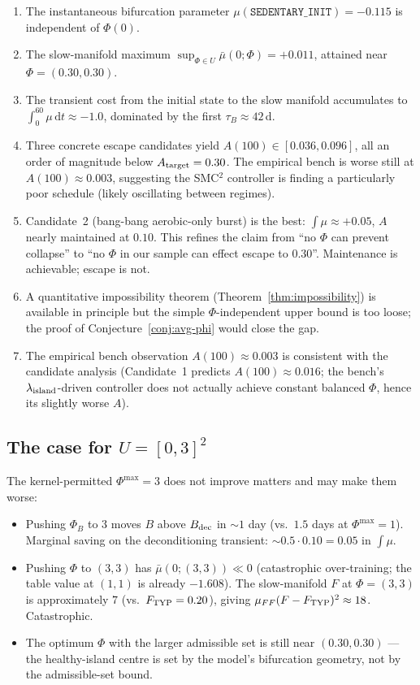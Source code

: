 \documentclass[11pt,a4paper]{article}
\theoremstyle{definition}
\newcommand{\dd}{\,\mathrm{d}}
\begin{document}
\begin{enumerate}
  \item The instantaneous bifurcation parameter $\mu(\texttt{SEDENTARY\_INIT}) = -0.115$ is independent of $\Phi(0)$.
  \item The slow-manifold maximum $\sup_{\Phi \in U} \bar\mu(0; \Phi) = +0.011$, attained near $\Phi = (0.30, 0.30)$.
  \item The transient cost from the initial state to the slow manifold accumulates to $\int_0^{60} \mu \dd t \approx -1.0$, dominated by the first $\tau_B \approx 42$\,d.
  \item Three concrete escape candidates yield $A(100) \in [0.036, 0.096]$, all an order of magnitude below $A_{\rm target} = 0.30$. The empirical bench is worse still at $A(100) \approx 0.003$, suggesting the SMC$^2$ controller is finding a particularly poor schedule (likely oscillating between regimes).
  \item Candidate~2 (bang-bang aerobic-only burst) is the best: $\int \mu \approx +0.05$, $A$ nearly maintained at $0.10$. This refines the claim from ``no $\Phi$ can prevent collapse'' to ``no $\Phi$ in our sample can effect escape to $0.30$''. Maintenance is achievable; escape is not.
  \item A quantitative impossibility theorem (Theorem~\ref{thm:impossibility}) is available in principle but the simple $\Phi$-independent upper bound is too loose; the proof of Conjecture~\ref{conj:avg-phi} would close the gap.
  \item The empirical bench observation $A(100) \approx 0.003$ is consistent with the candidate analysis (Candidate~1 predicts $A(100) \approx 0.016$; the bench's $\lambda_{\rm island}$-driven controller does not actually achieve constant balanced $\Phi$, hence its slightly worse $A$).
\end{enumerate}

\subsection{The case for $U = [0,3]^2$}

The kernel-permitted $\Phi^{\max} = 3$ does not improve matters and may make them worse:

\begin{itemize}
  \item Pushing $\Phi_B$ to $3$ moves $B$ above $B_{\rm dec}$ in $\sim 1$ day (vs.\ $1.5$ days at $\Phi^{\max} = 1$). Marginal saving on the deconditioning transient: $\sim 0.5 \cdot 0.10 = 0.05$ in $\int \mu$.
  \item Pushing $\Phi$ to $(3, 3)$ has $\bar\mu(0; (3,3)) \ll 0$ (catastrophic over-training; the table value at $(1,1)$ is already $-1.608$). The slow-manifold $F$ at $\Phi = (3,3)$ is approximately $7$ (vs.\ $F_{\rm TYP} = 0.20$), giving $\mu_{FF}(F - F_{\rm TYP})^2 \approx 18$. Catastrophic.
  \item The optimum $\Phi$ with the larger admissible set is still near $(0.30, 0.30)$ — the healthy-island centre is set by the model's bifurcation geometry, not by the admissible-set bound.
\end{itemize}
\end{document}

